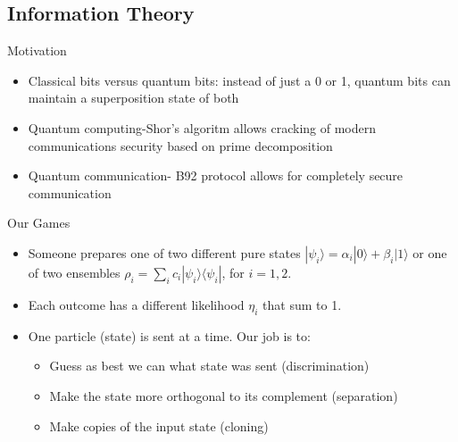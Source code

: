 \documentclass{beamer}
\newcommand{\br}[1]{\langle #1|}
\newcommand{\ke}[1]{|#1\rangle}
\newcommand{\kb}[2]{\ke{#1}\br{#2}}
\begin{document}
\subsection{Information Theory}
\begin{frame}{Motivation}
\begin{itemize}
\item
Classical bits versus quantum bits: instead of just a 0 or 1, quantum bits can maintain a superposition state of both
\pause
\item
Quantum computing-Shor's algoritm allows cracking of modern communications security based on prime decomposition
\pause
\item
Quantum communication- B92 protocol allows for completely secure communication
\end{itemize}
\end{frame}
\begin{frame}{Our Games}
\begin{itemize}
\item
Someone prepares one of two different pure states $\ke {\psi_i} = \alpha_i \ke 0 +  \beta_i \ke 1$
or one of two ensembles $\rho_i = \sum_i c_i \kb{\psi_i}{\psi_i}$, for $i = 1,2$.
\pause
\item
Each outcome has a different likelihood $\eta_i$ that sum to 1.
\pause
\item
One particle (state) is sent at a time.  Our job is to:
\begin{itemize}
\item
 Guess as best we can what state was sent (discrimination)
\item Make the state more orthogonal to its complement (separation)
\item
Make copies of the input state (cloning)

\end{itemize}

\end{itemize}

\end{frame}
\end{document}
